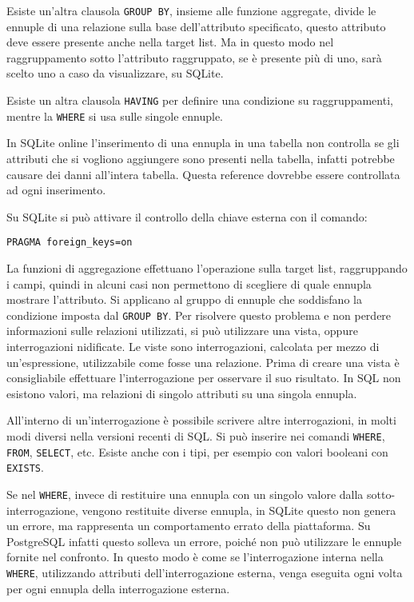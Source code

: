 \documentclass{article}
\numberwithin{equation}{subsection}
\begin{document}
Esiste un'altra clausola \verb|GROUP BY|, insieme alle funzione aggregate, divide le ennuple di una relazione sulla base dell'attributo specificato, questo attributo deve 
essere presente anche nella target list. 
Ma in questo modo nel raggruppamento sotto l'attributo raggruppato, se è presente più di uno, sarà scelto uno a caso da visualizzare, su SQLite. 

Esiste un altra clausola \verb|HAVING| per definire una condizione su raggruppamenti, mentre la \verb|WHERE| si usa sulle singole ennuple. 


In SQLite online l'inserimento di una ennupla in una tabella non controlla se gli attributi che si vogliono aggiungere sono presenti nella tabella, infatti 
potrebbe causare dei danni all'intera tabella. Questa reference dovrebbe essere controllata ad ogni inserimento. 

Su SQLite si può attivare il controllo della chiave esterna con il comando:
\begin{verbatim}
PRAGMA foreign_keys=on
\end{verbatim}

La funzioni di aggregazione effettuano l'operazione sulla target list, raggruppando i campi, quindi in alcuni casi non permettono di scegliere di quale ennupla mostrare 
l'attributo. Si applicano al gruppo di ennuple che soddisfano la condizione imposta dal \verb|GROUP BY|. 
Per risolvere questo problema e non perdere informazioni sulle relazioni utilizzati, si può utilizzare una vista, oppure interrogazioni nidificate. Le viste sono 
interrogazioni, calcolata per mezzo di un'espressione, utilizzabile come fosse una relazione. Prima di creare una vista è consigliabile 
effettuare l'interrogazione per osservare il suo risultato. 
In SQL non esistono valori, ma relazioni di singolo attributi su una singola ennupla. 

All'interno di un'interrogazione è possibile scrivere altre interrogazioni, in molti modi diversi nella versioni recenti di SQL. Si può inserire nei comandi \verb|WHERE|, 
\verb|FROM|, \verb|SELECT|, etc. Esiste anche con i tipi, per esempio con valori booleani con \verb|EXISTS|. 

Se nel \verb|WHERE|, invece di restituire una ennupla con un singolo valore dalla sotto-interrogazione, vengono restituite diverse ennupla, in SQLite questo non genera 
un errore, ma rappresenta un comportamento errato della piattaforma. Su PostgreSQL infatti questo solleva un errore, poiché non può utilizzare le ennuple fornite nel 
confronto. In questo modo è come se l'interrogazione interna nella \verb|WHERE|, utilizzando attributi dell'interrogazione esterna, venga eseguita ogni volta per ogni 
ennupla della interrogazione esterna. 
\end{document}
